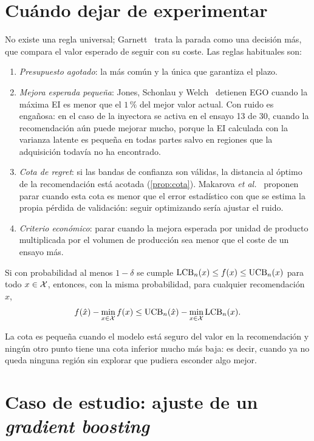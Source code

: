 \section{Cuándo dejar de experimentar}

No existe una regla universal; Garnett~\cite[§5.4 y §9.3]{garnett} trata la parada como una decisión más, que compara el valor esperado de seguir con su coste. Las reglas habituales son:
\begin{enumerate}
  \item \emph{Presupuesto agotado}: la más común y la única que garantiza el plazo.
  \item \emph{Mejora esperada pequeña}: Jones, Schonlau y Welch~\cite[§4.2]{jones} detienen EGO cuando la máxima EI es menor que el $1\,\%$ del mejor valor actual. Con ruido es engañosa: en el caso de la inyectora se activa en el ensayo 13 de 30, cuando la recomendación aún puede mejorar mucho, porque la EI calculada con la varianza latente es pequeña en todas partes salvo en regiones que la adquisición todavía no ha encontrado.
  \item \emph{Cota de regret}: si las bandas de confianza son válidas, la distancia al óptimo de la recomendación está acotada (\cref{prop:cota}). Makarova \emph{et al.}~\cite{makarova} proponen parar cuando esta cota es menor que el error estadístico con que se estima la propia pérdida de validación: seguir optimizando sería ajustar el ruido.
  \item \emph{Criterio económico}: parar cuando la mejora esperada por unidad de producto multiplicada por el volumen de producción sea menor que el coste de un ensayo más.
\end{enumerate}

\begin{proposicion}\label{prop:cota}
Si con probabilidad al menos $1-\delta$ se cumple $\operatorname{LCB}_n(x)\le f(x)\le\operatorname{UCB}_n(x)$ para todo $x\in\mathcal{X}$, entonces, con la misma probabilidad, para cualquier recomendación $\hat x$,
\[
f(\hat x)-\min_{x\in\mathcal{X}}f(x)\le\operatorname{UCB}_n(\hat x)-\min_{x\in\mathcal{X}}\operatorname{LCB}_n(x).
\]
\end{proposicion}

La cota es pequeña cuando el modelo está seguro del valor en la recomendación y ningún otro punto tiene una cota inferior mucho más baja: es decir, cuando ya no queda ninguna región sin explorar que pudiera esconder algo mejor.

\section{Caso de estudio: ajuste de un \emph{gradient boosting}}

